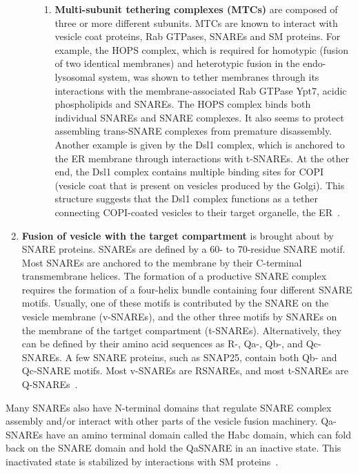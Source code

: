 \begin{enumerate}
\begin{enumerate}[label=(\roman*)]
\begin{enumerate}[label=(\alph*)]
	    		\item \textbf{Multi-subunit tethering complexes (MTCs)} are composed of three or more different
	    		subunits.
	    		MTCs are known to interact with vesicle coat proteins, Rab GTPases, SNAREs and SM proteins.
	    		For example, the HOPS complex, which is required for homotypic (fusion of two identical
	    		membranes) and heterotypic fusion in the endo-lysosomal system, was shown to tether membranes
	    		through its interactions with the membrane-associated Rab GTPase Ypt7, acidic phospholipids and
	    		SNAREs. 
	    		The HOPS complex binds both individual SNAREs and SNARE complexes. It also
	    		seems to protect assembling trans-SNARE complexes from premature disassembly. 
	    		Another example is given by the Dsl1 complex, which is anchored to the ER membrane through interactions
	    		with t-SNAREs. 
	    		At the other end, the Dsl1 complex contains multiple binding sites for COPI
	    		(vesicle coat that is present on vesicles produced by the Golgi). 
	    		This structure suggests that the Dsl1
	    		complex functions as a tether connecting COPI-coated vesicles to their target organelle, the ER~\cite{baker2016chaperoning}.
	    		
	    	\end{enumerate}
    		    
      \end{enumerate}
	  
	  \item \textbf{Fusion of vesicle with the target compartment} is brought about by SNARE proteins. 
	  SNAREs
	  are defined by a 60- to 70-residue SNARE motif. Most SNAREs are anchored to the membrane by
	  their C-terminal transmembrane helices. 
	  The formation of a productive SNARE complex requires
	  the formation of a four-helix bundle containing four different SNARE motifs. Usually, one of these
	  motifs is contributed by the SNARE on the vesicle membrane (v-SNAREs), and the other three
	  motifs by SNAREs on the membrane of the tartget compartment (t-SNAREs). 
	  Alternatively, they
	  can be defined by their amino acid sequences as R-, Qa-, Qb-, and Qc-SNAREs. A few SNARE
	  proteins, such as SNAP25, contain both Qb- and Qc-SNARE motifs.
	  Most v-SNAREs are RSNAREs, and most t-SNAREs are Q-SNAREs~\cite{yoon2018snare}.
	  
	  
\end{enumerate}

Many SNAREs also have N-terminal domains that regulate SNARE complex assembly and/or
interact with other parts of the vesicle fusion machinery. 
%
Qa-SNAREs have an amino terminal
domain called the Habc domain, which can fold back on the SNARE domain and hold the QaSNARE
in an inactive state. 
%
This inactivated state is stabilized by interactions with SM proteins~\cite{yoon2018snare}.	      

